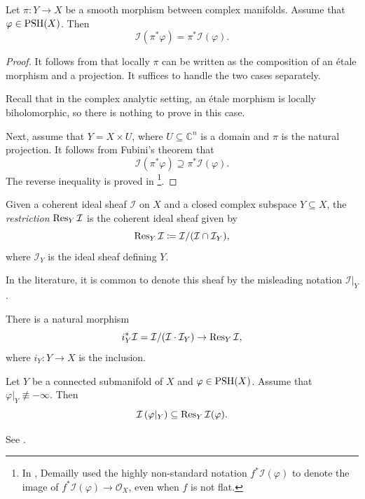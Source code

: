 \begin{proposition}\label{prop:pull-backmis}
    Let $\pi\colon Y\rightarrow X$ be a smooth morphism between complex manifolds. Assume that $\varphi\in \mathrm{PSH}(X)$. Then
    \[
    \mathcal{I}(\pi^*\varphi)=\pi^*\mathcal{I}(\varphi).
    \]
\end{proposition}
\begin{proof}
    It follows from \cite[Théorème~3.10]{SHC6} that locally $\pi$ can be written as the composition of an étale morphism and a projection. It suffices to handle the two cases separately.

    Recall that in the complex analytic setting, an étale morphism is locally biholomorphic, so there is nothing to prove in this case.

    Next, assume that $Y=X\times U$, where $U\subseteq \mathbb{C}^n$ is a domain and $\pi$ is the natural projection. It follows from Fubini's theorem that
    \[
    \mathcal{I}(\pi^*\varphi)\supseteq \pi^*\mathcal{I}(\varphi).
    \]
    The reverse inequality is proved in \cite[Proposition~14.3]{Dem12}\footnote{In \cite[Proposition~14.3]{Dem12}, Demailly used the highly non-standard notation $f^*\mathcal{I}(\varphi)$ to denote the image of $f^*\mathcal{I}(\varphi)\rightarrow \mathcal{O}_X$, even when $f$ is not flat.}.
\end{proof}

\begin{definition}\label{def:restidealsheaf}
    Given a coherent ideal sheaf $\mathcal{I}$ on $X$ and a closed complex subspace $Y\subseteq X$, the \emph{restriction}  $\operatorname{Res}_Y\mathcal{I}$  is the coherent ideal sheaf given by
\begin{equation}\label{eq:RestI}
    \operatorname{Res}_Y\mathcal{I}\coloneqq \mathcal{I}/(\mathcal{I}\cap \mathcal{I}_Y),
\end{equation}
where $\mathcal{I}_Y$ is the ideal sheaf defining $Y$.
\end{definition}
In the literature, it is common to denote this sheaf by the misleading notation $\mathcal{I}|_Y$.

There is a natural morphism
\begin{equation}\label{eq:pullbacktoinverimage}
    i_Y^*\mathcal{I}=  \mathcal{I}/(\mathcal{I}\cdot \mathcal{I}_Y)\rightarrow \operatorname{Res}_Y \mathcal{I},
\end{equation}
where $i_Y\colon Y\rightarrow X$ is the inclusion.

\begin{theorem}\label{thm:OT}
    Let $Y$ be a connected submanifold of $X$ and $\varphi\in \mathrm{PSH}(X)$. Assume that $\varphi|_Y\not\equiv -\infty$. Then
    \[
    \mathcal{I}\left(\varphi|_Y\right)\subseteq \operatorname{Res}_Y\mathcal{I}(\varphi).
    \]
\end{theorem}
See \cite[Theorem~14.1]{Dem12}.


